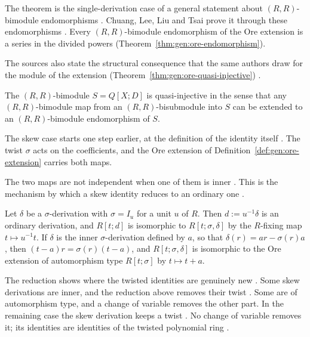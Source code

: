 The theorem is the single-derivation case of a general statement about
$(R,R)$-bimodule endomorphisms \cite[p.~164]{ChuangLee2010Higher}. Chuang,
Lee, Liu and Tsai prove it through these endomorphisms \cite[Theorem~3,
p.~164]{ChuangLee2010Higher}. Every $(R,R)$-bimodule endomorphism of the Ore
extension is a series in the divided powers
(Theorem~\ref{thm:gen:ore-endomorphism}).

The sources also state the structural consequence that the same authors draw
for the module of the extension (Theorem~\ref{thm:gen:ore-quasi-injective})
\cite[p.~169]{ChuangLee2010Higher}.

\begin{theorem}\label{thm:gen:ore-quasi-injective}
The $(R,R)$-bimodule $S=Q[X;D]$ is quasi-injective in the sense that any
$(R,R)$-bimodule map from an $(R,R)$-bisubmodule into $S$ can be extended to an
$(R,R)$-bimodule endomorphism of $S$.
\end{theorem}

The skew case starts one step earlier, at the definition of the identity
itself \cite[p.~2838]{Chuang2017Auto}. The twist $\sigma$ acts on the
coefficients, and the Ore extension of
Definition~\ref{def:gen:ore-extension} carries both maps.

The two maps are not independent when one of them is inner
\cite[p.~2841]{Chuang2017Auto}. This is the mechanism by which a skew identity
reduces to an ordinary one \cite[p.~2841]{Chuang2017Auto}.

\begin{remark}\label{rem:gen:skew-reduce}
Let $\delta$ be a $\sigma$-derivation with $\sigma=I_{u}$ for a unit $u$ of
$R$. Then $d:=u^{-1}\delta$ is an ordinary derivation, and $R[t;d]$ is
isomorphic to $R[t;\sigma,\delta]$ by the $R$-fixing map $t\mapsto u^{-1}t$. If
$\delta$ is the inner $\sigma$-derivation defined by $a$, so that
$\delta(r)=ar-\sigma(r)a$, then $(t-a)r=\sigma(r)(t-a)$, and
$R[t;\sigma,\delta]$ is isomorphic to the Ore extension of automorphism type
$R[t;\sigma]$ by $t\mapsto t+a$.
\end{remark}

The reduction shows where the twisted identities are genuinely new
\cite[p.~2838]{Chuang2017Auto}. Some skew derivations are inner, and the
reduction above removes their twist
\cite[p.~2841]{Chuang2017Auto}. Some are of automorphism type, and a
change of variable removes the other part. In the remaining case the skew
derivation keeps a twist \cite[p.~2841]{Chuang2017Auto}. No change of
variable removes it; its identities are identities of the twisted polynomial
ring \cite[p.~2841]{Chuang2017Auto}.

